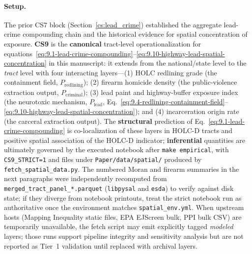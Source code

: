\paragraph{Setup.}
The prior CS7 block (Section~\ref{cs:lead_crime}) established the aggregate lead-crime compounding chain and the historical evidence for spatial concentration of exposure. \textbf{CS9} is the \textbf{canonical} tract-level operationalization for equations~\ref{eq:9.1-lead-crime-compounding}--\ref{eq:9.10-highway-lead-spatial-concentration} in this manuscript: it extends from the national/state level to the \textit{tract} level with four interacting layers---(1) HOLC redlining grade (the containment field, $P_{\text{redlining}}$); (2) firearm homicide density (the public-violence extraction output, $P_{\text{criminal}}$); (3) lead paint and highway-buffer exposure index (the neurotoxic mechanism, $P_{\text{lead}}$, Eq.~\ref{eq:9.4-redlining-containment-field}--\ref{eq:9.10-highway-lead-spatial-concentration}); and (4) incarceration origin rate (the carceral extraction output). The \textbf{structural} prediction of Eq.~\ref{eq:9.1-lead-crime-compounding} is co-localization of these layers in HOLC-D tracts and positive spatial association of the HOLC-D indicator; \textbf{inferential} quantities are ultimately governed by the executed notebook after \texttt{make empirical}, with \texttt{CS9\_STRICT=1} and files under \texttt{Paper/data/spatial/} produced by \texttt{fetch\_spatial\_data.py}. The numbered Moran and firearm summaries in the next paragraphs were independently recomputed from \texttt{merged\_tract\_panel\_*.parquet} (\texttt{libpysal} and \texttt{esda}) to verify against disk state; if they diverge from notebook printouts, treat the strict notebook run as authoritative once the environment matches \texttt{spatial\_env.yml}. When upstream hosts (Mapping Inequality static files, EPA EJScreen bulk, PPI bulk CSV) are temporarily unavailable, the fetch script may emit explicitly tagged \emph{modeled} layers; those runs support pipeline integrity and sensitivity analysis but are not reported as Tier~1 validation until replaced with archival layers.

